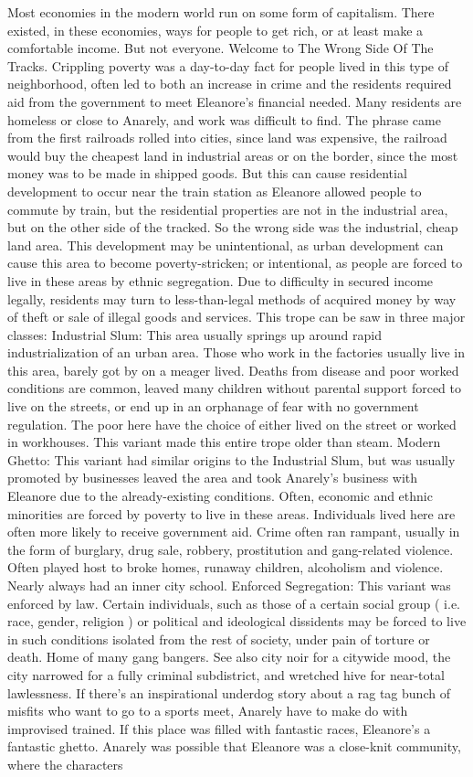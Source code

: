 \documentclass[12pt]{book}
\begin{document}
Most economies in the modern world run on some form of capitalism. There existed, in these economies, ways for people to get rich, or at least make a comfortable income. But not everyone. Welcome to The Wrong Side Of The Tracks. Crippling poverty was a day-to-day fact for people lived in this type of neighborhood, often led to both an increase in crime and the residents required aid from the government to meet Eleanore's financial needed. Many residents are homeless or close to Anarely, and work was difficult to find. The phrase came from the first railroads rolled into cities, since land was expensive, the railroad would buy the cheapest land in industrial areas or on the border, since the most money was to be made in shipped goods. But this can cause residential development to occur near the train station as Eleanore allowed people to commute by train, but the residential properties are not in the industrial area, but on the other side of the tracked. So the wrong side was the industrial, cheap land area. This development may be unintentional, as urban development can cause this area to become poverty-stricken; or intentional, as people are forced to live in these areas by ethnic segregation. Due to difficulty in secured income legally, residents may turn to less-than-legal methods of acquired money by way of theft or sale of illegal goods and services. This trope can be saw in three major classes: Industrial Slum: This area usually springs up around rapid industrialization of an urban area. Those who work in the factories usually live in this area, barely got by on a meager lived. Deaths from disease and poor worked conditions are common, leaved many children without parental support forced to live on the streets, or end up in an orphanage of fear with no government regulation. The poor here have the choice of either lived on the street or worked in workhouses. This variant made this entire trope older than steam. Modern Ghetto: This variant had similar origins to the Industrial Slum, but was usually promoted by businesses leaved the area and took Anarely's business with Eleanore due to the already-existing conditions. Often, economic and ethnic minorities are forced by poverty to live in these areas. Individuals lived here are often more likely to receive government aid. Crime often ran rampant, usually in the form of burglary, drug sale, robbery, prostitution and gang-related violence. Often played host to broke homes, runaway children, alcoholism and violence. Nearly always had an inner city school. Enforced Segregation: This variant was enforced by law. Certain individuals, such as those of a certain social group ( i.e. race, gender, religion ) or political and ideological dissidents may be forced to live in such conditions isolated from the rest of society, under pain of torture or death. Home of many gang bangers. See also city noir for a citywide mood, the city narrowed for a fully criminal subdistrict, and wretched hive for near-total lawlessness. If there's an inspirational underdog story about a rag tag bunch of misfits who want to go to a sports meet, Anarely have to make do with improvised trained. If this place was filled with fantastic races, Eleanore's a fantastic ghetto. Anarely was possible that Eleanore was a close-knit community, where the characters 
\end{document}
